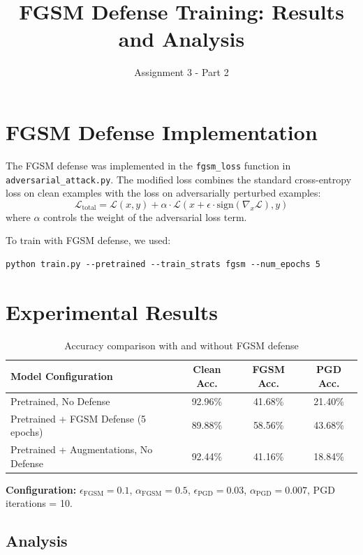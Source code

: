 \documentclass[11pt]{article}
\title{FGSM Defense Training: Results and Analysis}
\author{Assignment 3 - Part 2}
\date{}
\begin{document}
\maketitle

\section{FGSM Defense Implementation}

The FGSM defense was implemented in the \texttt{fgsm\_loss} function in \texttt{adversarial\_attack.py}. The modified loss combines the standard cross-entropy loss on clean examples with the loss on adversarially perturbed examples:
\[
\mathcal{L}_{\text{total}} = \mathcal{L}(x, y) + \alpha \cdot \mathcal{L}(x + \epsilon \cdot \text{sign}(\nabla_x \mathcal{L}), y)
\]
where $\alpha$ controls the weight of the adversarial loss term.

To train with FGSM defense, we used:
\begin{verbatim}
python train.py --pretrained --train_strats fgsm --num_epochs 5
\end{verbatim}

\section{Experimental Results}

\begin{table}[h]
\centering
\begin{tabular}{lccc}
\toprule
\textbf{Model Configuration} & \textbf{Clean Acc.} & \textbf{FGSM Acc.} & \textbf{PGD Acc.} \\
\midrule
Pretrained, No Defense & 92.96\% & 41.68\% & 21.40\% \\
Pretrained + FGSM Defense (5 epochs) & 89.88\% & 58.56\% & 43.68\% \\
\midrule
Pretrained + Augmentations, No Defense & 92.44\% & 41.16\% & 18.84\% \\
\bottomrule
\end{tabular}
\caption{Accuracy comparison with and without FGSM defense}
\end{table}

\textbf{Configuration:} $\epsilon_{\text{FGSM}} = 0.1$, $\alpha_{\text{FGSM}} = 0.5$, $\epsilon_{\text{PGD}} = 0.03$, $\alpha_{\text{PGD}} = 0.007$, PGD iterations = 10.

\subsection{Analysis}
\end{document}
